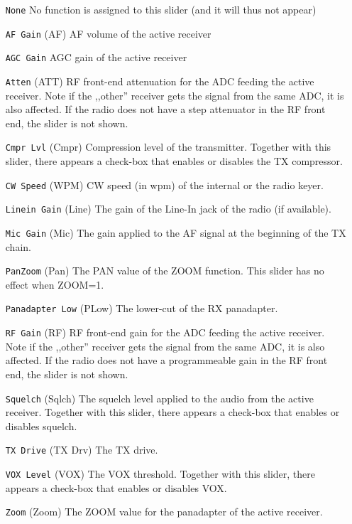 \documentclass[12pt]{book}
\def\rett#1{\texttt{\color{red}#1}}
\begin{document}
\begin{itemize}
\item[\rett{None}]{No function is assigned to this slider (and it will thus not appear)}
\item[\rett{AF Gain}]{(AF) AF volume of the active receiver}
\item[\rett{AGC Gain}]{AGC gain of the active receiver}
\item[\rett{Atten}]{(ATT) RF front-end attenuation for the ADC feeding the active receiver. Note if the ,,other''
receiver gets the signal from the same ADC, it is also affected. If the radio does not have a step attenuator
in the RF front end, the slider is not shown.}
\item[\rett{Cmpr Lvl}]{(Cmpr) Compression level of the transmitter. Together with this slider, there appears a
check-box that enables or disables the TX compressor.}
\item[\rett{CW Speed}]{(WPM) CW speed (in wpm) of the internal or the radio keyer.}
\item[\rett{Linein Gain}]{(Line) The gain of the Line-In jack of the radio (if available).}
\item[\rett{Mic Gain}]{(Mic) The gain applied to the AF signal at the beginning of the TX chain.}
\item[\rett{PanZoom}]{(Pan) The PAN value of the ZOOM function. This slider has no effect when ZOOM=1.}
\item[\rett{Panadapter Low}]{(PLow) The lower-cut of the RX panadapter.}
\item[\rett{RF Gain}]{(RF) RF front-end gain for the ADC feeding the active receiver. Note if the ,,other''
receiver gets the signal from the same ADC, it is also affected. If the radio does not have a programmeable
gain in the RF front end, the slider is not shown.}
\item[\rett{Squelch}]{(Sqlch) The squelch level applied to the audio from the active receiver. Together with this
slider, there appears a check-box that enables or disables squelch.}
\item[\rett{TX Drive}]{(TX Drv) The TX drive.}
\item[\rett{VOX Level}]{(VOX) The VOX threshold. Together with this slider, there appears a check-box that enables or disables VOX.}
\item[\rett{Zoom}]{(Zoom) The ZOOM value for the panadapter of the active receiver.}
\end{itemize}


\end{document}
